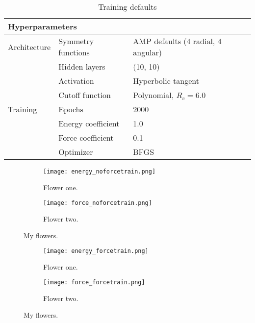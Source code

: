 \begin{table}[h]
\begin{tabular}{@{}lll@{}}
\toprule
\multicolumn{3}{l}{Hyperparameters}                                    \\ \midrule
Architecture & Symmetry functions & AMP defaults (4 radial, 4 angular) \\
             & Hidden layers      & (10, 10)                           \\
             & Activation         & Hyperbolic tangent                 \\
             & Cutoff function    & Polynomial, $R_c = 6.0$            \\
Training     & Epochs             & 2000                               \\
             & Energy coefficient & 1.0                                \\
             & Force coefficient  & 0.1                                \\
             & Optimizer          & BFGS                               \\ \bottomrule
\end{tabular}
\caption{Training defaults}
\label{table:defaults}
\end{table}

\begin{figure}[!tbp]
\begin{adjustbox}{max width=1.2\linewidth,center}
\centering
  \begin{subfigure}[b]{0.55\textwidth}
      \texttt{[image: energy\_noforcetrain.png]}
    \caption{Flower one.}
    \label{fig:f1}
  \end{subfigure}
  \hfill
  \begin{subfigure}[b]{0.55\textwidth}
      \texttt{[image: force\_noforcetrain.png]}
    \caption{Flower two.}
    \label{fig:f2}
  \end{subfigure}
\end{adjustbox}
\caption{My flowers.}
\end{figure}

\begin{figure}[!tbp]
\begin{adjustbox}{max width=1.2\linewidth,center}
\centering
  \begin{subfigure}[b]{0.55\textwidth}
      \texttt{[image: energy\_forcetrain.png]}
    \caption{Flower one.}
    \label{fig:f1}
  \end{subfigure}
  \hfill
  \begin{subfigure}[b]{0.55\textwidth}
      \texttt{[image: force\_forcetrain.png]}
    \caption{Flower two.}
    \label{fig:f2}
  \end{subfigure}
\end{adjustbox}
\caption{My flowers.}
\end{figure}


